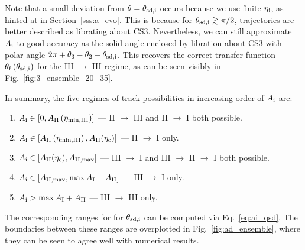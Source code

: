 \documentclass[
        fleqn,
        usenatbib,
        referee,
    ]{mnras}
\newcommand*{\p}[1]{\left(#1\right)}
\newcommand*{\s}[1]{\left[#1\right]}
\begin{document}
\begin{enumerate}
        Note that a small deviation from $\theta = \theta_{\rm sd, i}$ occurs
        because we use finite $\eta_{\rm i}$, as hinted at in Section~\ref{sss:a_evo}.
        This is because for $\theta_{\rm sd, i} \gtrsim \pi/2$, trajectories are
        better described as librating about CS3. Nevertheless, we can still
        approximate $A_{\rm i}$ to good accuracy as the solid angle enclosed by
        libration about CS3 with polar angle $2\pi + \theta_3 - \theta_2 -
        \theta_{\rm sd, i}$. This recovers the correct transfer function
        $\theta_{\rm f}\p{\theta_{\rm sd, i}}$ for the III $\to$ III regime, as
        can be seen visibly in Fig.~\ref{fig:3_ensemble_20_35}.
\end{enumerate}
In summary, the five regimes of track possibilities in increasing order of
$A_{\rm i}$
are:
\begin{enumerate}
    \item $A_{\rm i} \in \s{0, A_{\rm II}\p{\eta_{\rm \min, III}}}$ --- II $\to$
        III and II $\to$ I both possible.

    \item $A_{\rm i} \in \s{A_{\rm II}\p{\eta_{\rm \min, III}}, A_{\rm
        II}(\eta_{\rm c})}$ --- II $\to$ I only.

    \item $A_{\rm i} \in \s{A_{\rm II}(\eta_{\rm c}), A_{\rm II, \max}}$ ---
        III $\to$ I and III $\to$ II $\to$ I both possible.

    \item $A_{\rm i} \in \s{A_{\rm II, \max}, \max A_{\rm I} + A_{\rm II}}$ ---
        III $\to$ I only.

    \item $A_{\rm i} > \max A_{\rm I} + A_{\rm II}$ --- III $\to$ III only.
\end{enumerate}
The corresponding ranges for for $\theta_{\rm sd,i}$ can be computed via
Eq.~\eqref{eq:ai_qsd}. The boundaries between these ranges are overplotted in
Fig.~\ref{fig:ad_ensemble}, where they can be seen to agree well with numerical
results.
\end{document}
